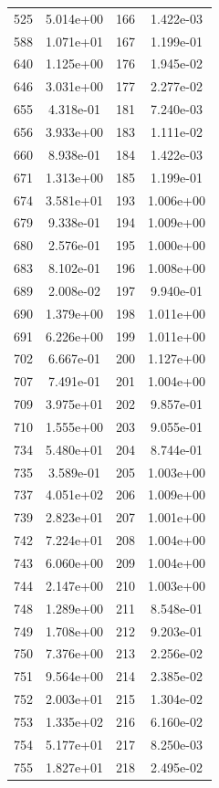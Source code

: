 \documentclass[12pt]{article}
\begin{document}
\begin{longtable}{@{}cccc@{}}
525 & 5.014e+00 & 166 & 1.422e-03 \\
588 & 1.071e+01 & 167 & 1.199e-01 \\
640 & 1.125e+00 & 176 & 1.945e-02 \\
646 & 3.031e+00 & 177 & 2.277e-02 \\
655 & 4.318e-01 & 181 & 7.240e-03 \\
656 & 3.933e+00 & 183 & 1.111e-02 \\
660 & 8.938e-01 & 184 & 1.422e-03 \\
671 & 1.313e+00 & 185 & 1.199e-01 \\
674 & 3.581e+01 & 193 & 1.006e+00 \\
679 & 9.338e-01 & 194 & 1.009e+00 \\
680 & 2.576e-01 & 195 & 1.000e+00 \\
683 & 8.102e-01 & 196 & 1.008e+00 \\
689 & 2.008e-02 & 197 & 9.940e-01 \\
690 & 1.379e+00 & 198 & 1.011e+00 \\
691 & 6.226e+00 & 199 & 1.011e+00 \\
702 & 6.667e-01 & 200 & 1.127e+00 \\
707 & 7.491e-01 & 201 & 1.004e+00 \\
709 & 3.975e+01 & 202 & 9.857e-01 \\
710 & 1.555e+00 & 203 & 9.055e-01 \\
734 & 5.480e+01 & 204 & 8.744e-01 \\
735 & 3.589e-01 & 205 & 1.003e+00 \\
737 & 4.051e+02 & 206 & 1.009e+00 \\
739 & 2.823e+01 & 207 & 1.001e+00 \\
742 & 7.224e+01 & 208 & 1.004e+00 \\
743 & 6.060e+00 & 209 & 1.004e+00 \\
744 & 2.147e+00 & 210 & 1.003e+00 \\
748 & 1.289e+00 & 211 & 8.548e-01 \\
749 & 1.708e+00 & 212 & 9.203e-01 \\
750 & 7.376e+00 & 213 & 2.256e-02 \\
751 & 9.564e+00 & 214 & 2.385e-02 \\
752 & 2.003e+01 & 215 & 1.304e-02 \\
753 & 1.335e+02 & 216 & 6.160e-02 \\
754 & 5.177e+01 & 217 & 8.250e-03 \\
755 & 1.827e+01 & 218 & 2.495e-02 \\

\end{longtable}
\end{document}
